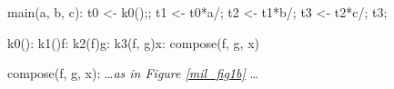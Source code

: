 \begin{minipage}{5in}%
\begin{center}%
\begin{minipage}{4in}%
\begin{AVerb}[numbers=left]
\block main(a, b, c): \label{mil_main_fig2}
  \vbinds t0 <- \goto k0();; \label{mil_t0_fig2}
  \vbinds t1 <- \app t0*a/; \label{mil_t1_fig2}
  \vbinds t2 <- \app t1*b/; \label{mil_t2_fig2}
  \vbinds t3 <- \app t2*c/; \label{mil_t3_fig2}
  \return t3;

\block k0(): \mkclo[k1:] \label{mil_k0_fig2}
\ccblock k1()f: \mkclo[k2:f] \label{mil_k1_fig2}
\ccblock k2(f)g: \mkclo[k3:f, g] \label{mil_k2_fig2}
\ccblock k3(f, g)x: \goto compose(f, g, x) \label{mil_k3_fig2}

\block compose(f, g, x): \dots {\rm\emph{as in Figure \ref{mil_fig1b}}} \dots 
\end{AVerb}
\end{minipage}%
\end{center}%
\end{minipage}%

